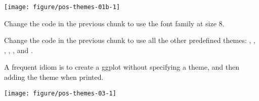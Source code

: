 \documentclass[krantz2]{krantz}\usepackage{knitr}%
\begin{document}
\begin{knitrout}\footnotesize
{}\color{fgcolor}\begin{kframe}
\begin{alltt}
  \hlopt{+}
  \hlstd{()} \hlopt{+}
  \hlstd{(} \hlstd{=} \hlstd{,}
              \hlstd{=} \hlstd{)}
\end{alltt}
\end{kframe}

{\centering \texttt{[image: figure/pos-themes-01b-1]} 

}



\end{knitrout}

\begin{playground}
Change the code in the previous chunk to use the  font family at size 8.
\end{playground}

\begin{playground}
Change the code in the previous chunk to use all the other predefined themes: , , , , ,  and .
\end{playground}

A frequent idiom is to create a ggplot without specifying a theme, and then adding the theme when printed.

\begin{knitrout}\footnotesize
{}\color{fgcolor}\begin{kframe}
\begin{alltt}
 \hlkwb{<-}   \hlopt{+}
       \hlstd{()}
 \hlopt{+} \hlstd{()}
\end{alltt}
\end{kframe}

{\centering \texttt{[image: figure/pos-themes-03-1]} 

}



\end{knitrout}
\end{document}
